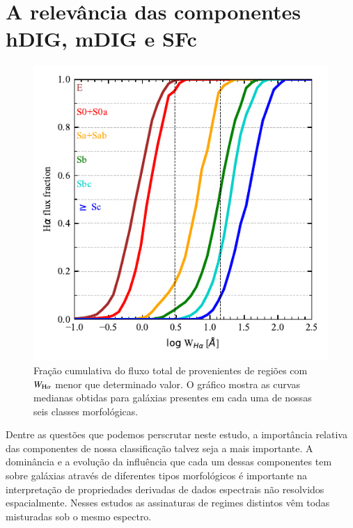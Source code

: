 \section{A relevância das componentes hDIG, mDIG e SFc}
\label{sec:DIGdisc:relstrenghts}

\begin{figure}
 \includegraphics{figuras/fig_cumul_fHaWHa_per_morftype.pdf}
 \caption[Fração cumulativa do fluxo de ${\rm H}\alpha$ com o crescimento de $W_{{\rm H}\alpha}$ para diferentes classes morfológicas]
 {Fração cumulativa do fluxo total de \Ha provenientes de regiões com $W_{\Ha}$ menor que determinado valor. O gráfico mostra as curvas medianas obtidas para galáxias presentes em cada uma de nossas seis classes morfológicas.}
 \label{fig:CurveOfGrowth}
\end{figure}

Dentre as questões que podemos perscrutar neste estudo, a importância relativa das componentes de nossa classificação talvez seja a mais importante. A dominância e a evolução da influência que cada um dessas componentes tem sobre galáxias através de diferentes tipos morfológicos é importante na interpretação de propriedades derivadas de dados espectrais não resolvidos espacialmente. Nesses estudos as assinaturas de regimes distintos vêm todas misturadas sob o mesmo espectro.

